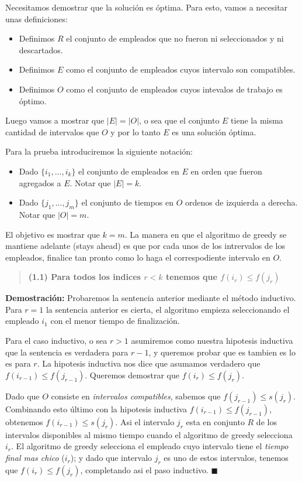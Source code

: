 \documentclass{article}
\begin{document}
Necesitamos demostrar que la solución es óptima. Para esto, vamos a necesitar unas definiciones:
\begin{itemize}
    \item Definimos \(R\) el conjunto de empleados que no fueron ni seleccionados y ni descartados.
    \item Definimos \(E\) como el conjunto de empleados cuyos intervalo son compatibles.
    \item Definimos \(O\) como el conjunto de empleados cuyos intevalos de trabajo es óptimo.
\end{itemize}
Luego vamos a mostrar que \(|E| = |O|\), o sea que el conjunto \(E\) tiene la misma cantidad de intervalos que \(O\) y 
por lo tanto \(E\) es una solución óptima.

Para la prueba introduciremos la siguiente notación:
\begin{itemize}
    \item Dado \(\{i_1,...,i_k\}\) el conjunto de empleados en \(E\) en orden que fueron agregados a \(E\). Notar que \(|E|=k\).
    \item Dado \(\{j_1,...,j_m\}\) el conjunto de tiempos en \(O\) ordenos de izquierda a derecha. Notar que \(|O|=m\).
\end{itemize}

El objetivo es mostrar que \(k=m\). 
La manera en que el algoritmo de greedy se mantiene adelante (stays ahead) es que por cada unos de los intrervalos de los empleados, 
finalice tan pronto como lo haga el correspodiente intervalo en \(O\).

\begin{quote}
    \textbf{(1.1) Para todos los indices \(r<k\) tenemos que \(f(i_r) \leq f(j_r)\)}
\end{quote}

\textbf{Demostración:}  Probaremos la sentencia anterior mediante el método inductivo. 
Para \(r=1\) la sentencia anterior es cierta, el algoritmo empieza seleccionando el empleado \(i_1\) con el menor tiempo de finalización.

Para el caso inductivo, o sea \(r>1\) asumiremos como nuestra hipotesis inductiva que la sentencia es verdadera para \(r-1\), y queremos probar que es tambien es lo es para \(r\). 
La hipotesis inductiva nos dice que asumamos verdadero que \(f(i_{r-1}) \leq f(j_{r-1})\). Queremos demostrar que \(f(i_{r}) \leq f(j_{r})\).

Dado que \(O\) consiste en \textit{intervalos compatibles}, sabemos que \(f(j_{r-1}) \leq s(j_r)\). Combinando esto último con la hipotesis inductiva \(f(i_{r-1}) \leq f(j_{r-1})\), obtenemos \(f(i_{r-1}) \leq s(j_{r})\). 
Asi el intervalo \(j_r\) esta en conjunto \(R\) de los intervalos disponibles al mismo tiempo cuando el algoritmo de greedy selecciona \(i_r\).
El algoritmo de greedy selecciona el empleado cuyo intervalo tiene el \textit{tiempo final mas chico} (\(i_{r}\)); y dado que intervalo \(j_{r}\) es uno de estos intervalos, tenemos que \(f(i_r) \leq f(j_r)\), completando asi el paso inductivo. \(\blacksquare\)
\end{document}
